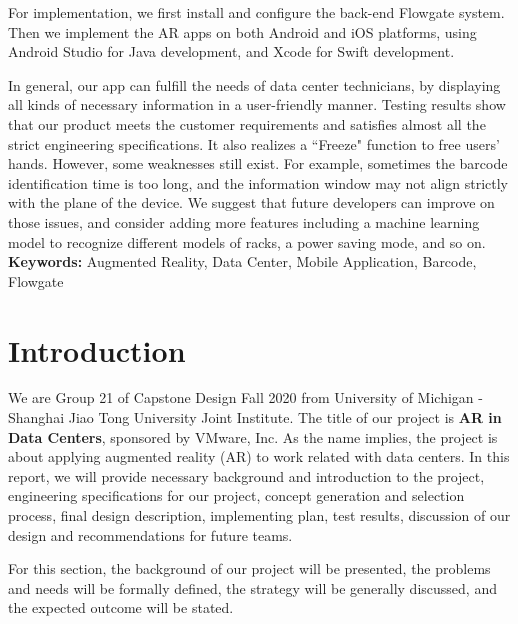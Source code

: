 \documentclass[11pt,a4paper]{article}
\begin{document}
\begin{onehalfspace}
For implementation, we first install and configure the back-end Flowgate system. Then we implement the AR apps on both Android and iOS platforms, using  Android Studio for Java development, and Xcode for Swift development.

In general, our app can fulfill the needs of data center technicians, by displaying all kinds of necessary information in a user-friendly manner. Testing results show that our product meets the customer requirements and satisfies almost all the strict engineering specifications. It also realizes a ``Freeze" function to free users’ hands. However, some weaknesses still exist. For example, sometimes the barcode identification time is too long, and the information window may not align strictly with the plane of the device. We suggest that future developers can improve on those issues, and consider adding more features including a machine learning model to recognize different models of racks, a power saving mode, and so on.\\[6pt]

\noindent \textbf{Keywords:} Augmented Reality, Data Center, Mobile Application, Barcode, Flowgate
\newpage
\tableofcontents
\newpage

\section{Introduction}
We are Group 21 of Capstone Design Fall 2020 from University of Michigan - Shanghai Jiao Tong University Joint Institute. The title of our project is \textbf{AR in Data Centers}, sponsored by VMware, Inc. As the name implies, the project is about applying augmented reality (AR) to work related with data centers. In this report, we will provide necessary background and introduction to the project, engineering specifications for our project, concept generation and selection process, final design description, implementing plan, test results, discussion of our design and recommendations for future teams.

For this section, the background of our project will be presented, the problems and needs will be formally defined, the strategy will be generally discussed, and the expected outcome will be stated.


\end{onehalfspace}
\end{document}
